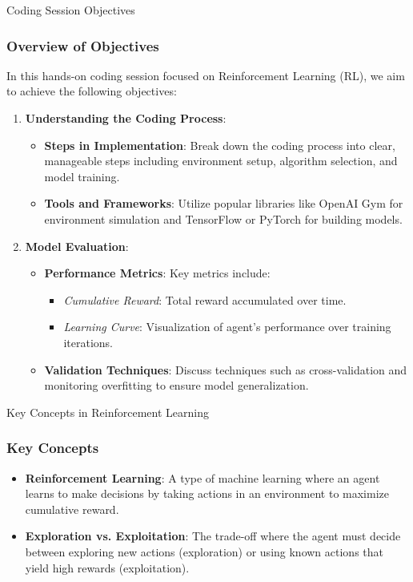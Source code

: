 \documentclass[aspectratio=169]{beamer}
\begin{document}
\begin{frame}{Coding Session Objectives}
    \frametitle{Overview of Objectives}
    In this hands-on coding session focused on Reinforcement Learning (RL), we aim to achieve the following objectives:
    \begin{enumerate}
        \item \textbf{Understanding the Coding Process}:
        \begin{itemize}
            \item \textbf{Steps in Implementation}: Break down the coding process into clear, manageable steps including environment setup, algorithm selection, and model training.
            \item \textbf{Tools and Frameworks}: Utilize popular libraries like OpenAI Gym for environment simulation and TensorFlow or PyTorch for building models.
        \end{itemize}
        
        \item \textbf{Model Evaluation}:
        \begin{itemize}
            \item \textbf{Performance Metrics}: Key metrics include:
            \begin{itemize}
                \item \textit{Cumulative Reward}: Total reward accumulated over time.
                \item \textit{Learning Curve}: Visualization of agent's performance over training iterations.
            \end{itemize}
            \item \textbf{Validation Techniques}: Discuss techniques such as cross-validation and monitoring overfitting to ensure model generalization.
        \end{itemize}
    \end{enumerate}
\end{frame}

\begin{frame}{Key Concepts in Reinforcement Learning}
    \frametitle{Key Concepts}
    \begin{itemize}
        \item \textbf{Reinforcement Learning}: A type of machine learning where an agent learns to make decisions by taking actions in an environment to maximize cumulative reward.
        \item \textbf{Exploration vs. Exploitation}: The trade-off where the agent must decide between exploring new actions (exploration) or using known actions that yield high rewards (exploitation).
    \end{itemize}
\end{frame}
\end{document}
